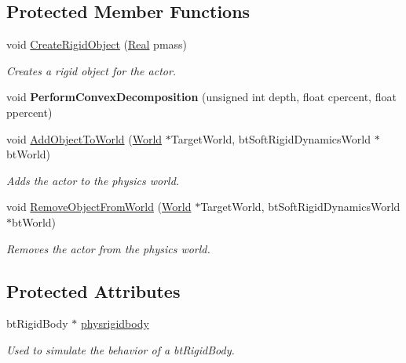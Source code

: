 \subsection*{Protected Member Functions}
\begin{DoxyCompactItemize}
\item 
void \hyperlink{classphys_1_1ActorRigid_a19227c52b972cd96ad69a7b6273e2bbf}{CreateRigidObject} (\hyperlink{namespacephys_af7eb897198d265b8e868f45240230d5f}{Real} pmass)
\begin{DoxyCompactList}\small\item\em Creates a rigid object for the actor. \item\end{DoxyCompactList}\item 
\hypertarget{classphys_1_1ActorRigid_a63aac7ce099716928f7b9f4c6ef40453}{
void {\bfseries PerformConvexDecomposition} (unsigned int depth, float cpercent, float ppercent)}
\label{d8/d71/classphys_1_1ActorRigid_a63aac7ce099716928f7b9f4c6ef40453}

\item 
void \hyperlink{classphys_1_1ActorRigid_a3c56eb06fe6a7d468b7a67c45ade7be4}{AddObjectToWorld} (\hyperlink{classphys_1_1World}{World} $\ast$TargetWorld, btSoftRigidDynamicsWorld $\ast$btWorld)
\begin{DoxyCompactList}\small\item\em Adds the actor to the physics world. \item\end{DoxyCompactList}\item 
void \hyperlink{classphys_1_1ActorRigid_a74a4eaa5491b90a977e9db0457271f31}{RemoveObjectFromWorld} (\hyperlink{classphys_1_1World}{World} $\ast$TargetWorld, btSoftRigidDynamicsWorld $\ast$btWorld)
\begin{DoxyCompactList}\small\item\em Removes the actor from the physics world. \item\end{DoxyCompactList}\end{DoxyCompactItemize}
\subsection*{Protected Attributes}
\begin{DoxyCompactItemize}
\item 
\hypertarget{classphys_1_1ActorRigid_a690889f942e177644f4f8521f509c88d}{
btRigidBody $\ast$ \hyperlink{classphys_1_1ActorRigid_a690889f942e177644f4f8521f509c88d}{physrigidbody}}
\label{d8/d71/classphys_1_1ActorRigid_a690889f942e177644f4f8521f509c88d}

\begin{DoxyCompactList}\small\item\em Used to simulate the behavior of a btRigidBody. \item\end{DoxyCompactList}\end{DoxyCompactItemize}


